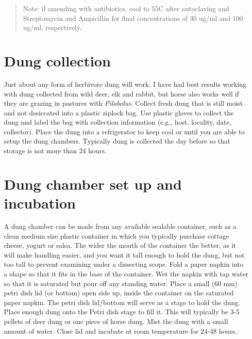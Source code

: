 \documentclass[]{book}
\begin{document}
\begin{quote}
Note: if amending with antibiotics, cool to 55C after autoclaving and Streptomycin and Ampicillin for final concentrations of 30 ug/ml and 100 ug/ml, respectively.
\end{quote}

\hypertarget{dung-collection-1}{%
\section{Dung collection}\label{dung-collection-1}}

Just about any form of herbivore dung will work. I have had best results working with dung collected from wild deer, elk and rabbit, but horse also works well if they are grazing in pastures with \emph{Pilobolus}. Collect fresh dung that is still moist and not desiccated into a plastic ziplock bag. Use plastic gloves to collect the dung and label the bag with collection information (e.g., host, locality, date, collector). Place the dung into a refrigerator to keep cool or until you are able to setup the dung chambers. Typically dung is collected the day before so that storage is not more than 24 hours.

\hypertarget{dung-chamber-set-up-and-incubation}{%
\section{Dung chamber set up and incubation}\label{dung-chamber-set-up-and-incubation}}

A dung chamber can be made from any available sealable container, such as a clean medium size plastic container in which you typically purchase cottage cheese, yogurt or salsa. The wider the mouth of the container the better, as it will make handling easier, and you want it tall enough to hold the dung, but not too tall to prevent examining under a dissecting scope. Fold a paper napkin into a shape so that it fits in the base of the container. Wet the napkin with tap water so that it is saturated but pour off any standing water. Place a small (60 mm) petri dish lid (or bottom) open side up, inside the container on the saturated paper napkin. The petri dish lid/bottom will serve as a stage to hold the dung. Place enough dung onto the Petri dish stage to fill it. This will typically be 3-5 pellets of deer dung or one piece of horse dung. Mist the dung with a small amount of water. Close lid and incubate at room temperature for 24-48 hours.
\end{document}
